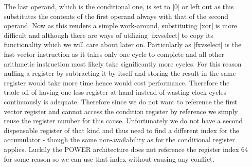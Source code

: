 The last operand, which is the conditional one, is set to |0| or left out as this substitutes the contents of the first operand always with that of the second operand.
Now as this renders a simple work-around, substituting |xor| is more difficult and although there are ways of utilizing |fxvselect| to copy its functionality  which we will care about later on.
Particularly as |fxvselect| is the fast vector instruction as it takes only one cycle to complete and all other arithmetic instruction most likely take significantly more cycles.
For this reason nulling a register by subtracting it by itself and storing the result in the same register would take more time hence would cost performance.
Therefore the trade-off of having one less register at hand instead of wasting clock cycles continuously is adequate.
Therefore since we do not want to reference the first vector register and cannot access the condition register by reference we simply reuse the register number for this cause.
Unfortunately we do not have a second dispensable register of that kind and thus need to find a different index for the accumulator - though the same non-availability as for the conditional register applies.
Luckily the POWER architecture does not reference the register index 64 for some reason so we can use that index without causing any conflict.

